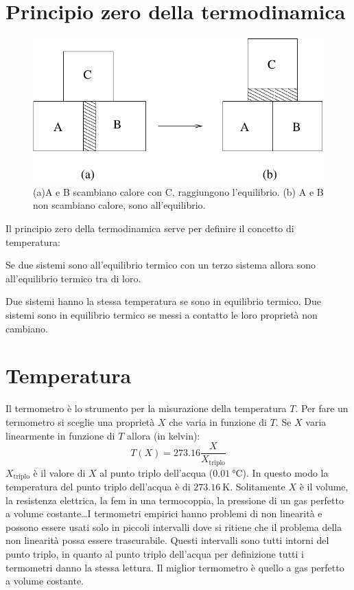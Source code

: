 \section{Principio zero della termodinamica}
\begin{figure}[htbp]
\centering
\includegraphics[scale=0.5]{immagini/fisica1/principio_zero}
\caption{(a)A e B scambiano calore con C, raggiungono l'equilibrio. (b) A e B non scambiano calore, sono all'equilibrio.}
\end{figure}
Il principio zero della termodinamica serve per definire il concetto di temperatura:
\begin{Pri}
Se due sistemi sono all'equilibrio termico con un terzo sistema allora sono all'equilibrio termico tra di loro.

Due sistemi hanno la stessa temperatura se sono in equilibrio termico. Due sistemi sono in equilibrio termico se messi a contatto le loro proprietà non cambiano.
\end{Pri}

\section{Temperatura}
Il termometro è lo strumento per la misurazione della temperatura $T$. Per fare un termometro si sceglie una proprietà $X$ che varia in funzione di $T$. Se $X$ varia linearmente in funzione di $T$ allora (in kelvin):
\begin{equation}
T(X)=273.16\frac{X}{X_\text{triplo}}
\end{equation}
$X_\text{triplo}$ è il valore di $X$ al punto triplo dell'acqua ($\SI{0.01}{\celsius}$). In questo modo la temperatura del punto triplo dell'acqua è di $\SI{273.16}{\kelvin}$. Solitamente $X$ è il volume, la resistenza elettrica, la fem in una termocoppia, la pressione di un gas perfetto a volume costante\ldots I termometri empirici hanno problemi di non linearità e possono essere usati solo in piccoli intervalli dove si ritiene che il problema della non linearità possa essere trascurabile. Questi intervalli sono tutti intorni del punto triplo, in quanto al punto triplo dell'acqua per definizione tutti i termometri danno la stessa lettura. Il miglior termometro è quello a gas perfetto a volume costante.

